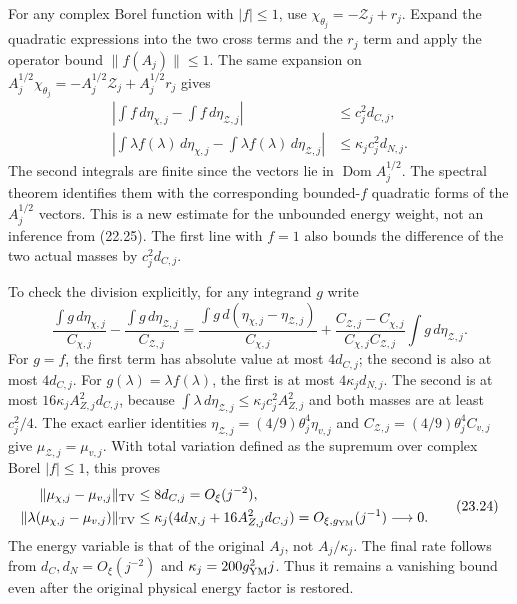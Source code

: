 \documentclass[
]{article}
\begin{document}
For any complex Borel function with \(|f|\le1\), use
\(\chi_{\theta_j}=-\mathcal Z_j+r_j\). Expand the quadratic expressions
into the two cross terms and the \(r_j\) term and apply the operator
bound \(\|f(A_j)\|\le1\). The same expansion on
\(A_j^{1/2}\chi_{\theta_j}
=-A_j^{1/2}\mathcal Z_j+A_j^{1/2}r_j\) gives \[
\begin{aligned}
\left|\int f\,d\eta_{\chi,j}-\int f\,d\eta_{\mathcal Z,j}\right|
 &\le c_j^2d_{C,j},\\
\left|\int \lambda f(\lambda)\,d\eta_{\chi,j}
             -\int \lambda f(\lambda)\,d\eta_{\mathcal Z,j}\right|
 &\le\kappa_jc_j^2d_{N,j}.
\end{aligned}\tag{23.22}
\] The second integrals are finite since the vectors lie in
\(\operatorname{Dom}A_j^{1/2}\). The spectral theorem identifies them
with the corresponding bounded-\(f\) quadratic forms of the
\(A_j^{1/2}\) vectors. This is a new estimate for the unbounded energy
weight, not an inference from (22.25). The first line with \(f=1\) also
bounds the difference of the two actual masses by \(c_j^2d_{C,j}\).

To check the division explicitly, for any integrand \(g\) write \[
\frac{\int g\,d\eta_{\chi,j}}{C_{\chi,j}}
-\frac{\int g\,d\eta_{\mathcal Z,j}}{C_{\mathcal Z,j}}
=\frac{\int g\,d(\eta_{\chi,j}-\eta_{\mathcal Z,j})}{C_{\chi,j}}
+\frac{C_{\mathcal Z,j}-C_{\chi,j}}
        {C_{\chi,j}C_{\mathcal Z,j}}
                \int g\,d\eta_{\mathcal Z,j}.
\tag{23.23}
\] For \(g=f\), the first term has absolute value at most \(4d_{C,j}\);
the second is also at most \(4d_{C,j}\). For
\(g(\lambda)=\lambda f(\lambda)\), the first is at most
\(4\kappa_jd_{N,j}\). The second is at most
\(16\kappa_jA_{Z,j}^2d_{C,j}\), because
\(\int\lambda\,d\eta_{\mathcal Z,j}\le
\kappa_jc_j^2A_{Z,j}^2\) and both masses are at least \(c_j^2/4\). The
exact earlier identities
\(\eta_{\mathcal Z,j}=(4/9)\theta_j^4\eta_{v,j}\) and
\(C_{\mathcal Z,j}=(4/9)\theta_j^4C_{v,j}\) give
\(\mu_{\mathcal Z,j}=\mu_{v,j}\). With total variation defined as the
supremum over complex Borel \(|f|\le1\), this proves \[
\begin{aligned}
\|\mu_{\chi,j}-\mu_{v,j}\|_{\rm TV}
 &\le8d_{C,j}=O_\xi(j^{-2}),\\
\|\lambda(\mu_{\chi,j}-\mu_{v,j})\|_{\rm TV}
 &\le\kappa_j(4d_{N,j}+16A_{Z,j}^2d_{C,j})
   =O_{\xi,g_{\rm YM}}(j^{-1})\longrightarrow0 .
\end{aligned}\tag{23.24}
\] The energy variable is that of the original \(A_j\), not
\(A_j/\kappa_j\). The final rate follows from \(d_C,d_N=O_\xi(j^{-2})\)
and \(\kappa_j=200g_{\rm YM}^2j\). Thus it remains a vanishing bound
even after the original physical energy factor is restored.
\end{document}
